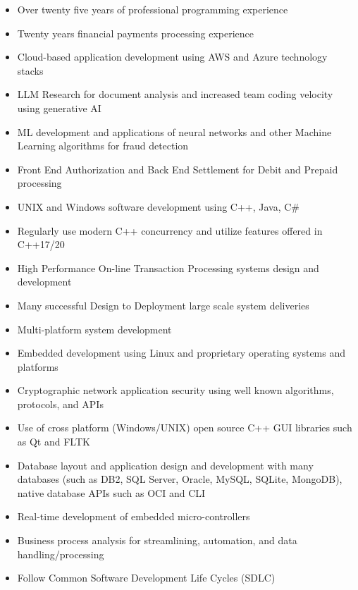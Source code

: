\documentclass[10pt]{report}
\begin{document}
\begin{itemize}

\item Over twenty five years of professional programming experience
\item Twenty years financial payments processing experience
\item Cloud-based application development using AWS and Azure technology stacks
\item LLM Research for document analysis and increased team coding velocity using generative AI
\item ML development and applications of neural networks and other Machine Learning algorithms for fraud detection
\item Front End Authorization and Back End Settlement for Debit and Prepaid processing
\item UNIX and Windows software development using C++, Java, C\#
\item Regularly use modern C++ concurrency and utilize features offered in C++17/20 
\item High Performance On-line Transaction Processing systems design and development
\item Many successful Design to Deployment large scale system deliveries
\item Multi-platform system development
\item Embedded development using Linux and proprietary operating systems and platforms
\item Cryptographic network application security using well known algorithms, protocols, and APIs
\item Use of cross platform (Windows/UNIX) open source C++ GUI libraries such as Qt and FLTK
\item Database layout and application design and development with many databases (such as DB2, SQL Server, Oracle, MySQL, SQLite, MongoDB), native database APIs such as OCI and CLI
\item Real-time development of embedded micro-controllers
\item Business process analysis for streamlining, automation, and data handling/processing
\item Follow Common Software Development Life Cycles (SDLC)
\end{itemize}
\end{document}
